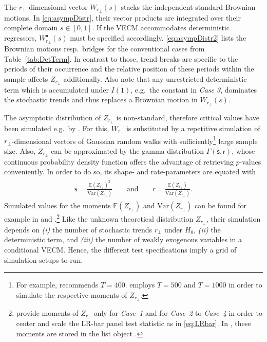 The $ r_\perp $-dimensional vector $ W_{r_\perp} {\left( s \right)} $ stacks the independent standard Brownian motions. In \eqref{eq:asympDistr}, their vector products are integrated over their complete domain $ s \in [0,1] $. If the VECM accommodates deterministic regressors, $ W^\bullet_{r_\perp} {\left( s \right)} $ must be specified accordingly. \eqref{eq:asympDistr2} lists the Brownian motions resp.~bridges for the conventional cases from Table~\ref{tab:DetTerm}. In contrast to those, trend breaks are specific to the periods of their occurrence and the relative position of these periods within the sample affects $ Z_{r_\perp} $ additionally. Also note that any unrestricted deterministic term which is accumulated under $ I(1) $, e.g.~the constant in \textit{Case 3}, dominates the stochastic trends and thus replaces a Brownian motion in $ W_{r_\perp} {\left( s \right)} $.

The asymptotic distribution of $ Z_{r_\perp} $ is non-standard, therefore critical values have been simulated e.g.~by \cite{OsterwaldLenum1992}. For this, $ W_{r_\perp} $ is substituted by a repetitive simulation of $ r_\perp $-dimensional vectors of Gaussian random walks with sufficiently\footnote{For example, \citet[Ch.~15]{Johansen1996} recommends $T=400$. \citet[p.~171, App.~B]{Breitung2005} employs $ T=500$ and \citet{OersalDroge2014} $ T=1000 $ in order to simulate the respective moments of $ Z_{r_\perp} $.} large sample size. Also, $ Z_{r_\perp} $ can be approximated by the gamma distribution $ \Gamma (\mathsf{s}, \mathsf{r}) $, whose continuous probability density function offers the advantage of retrieving $p$-values conveniently. In order to do so, its shape- and rate-parameters are equated with
\begin{align} \label{eq:GammaParameter}
\begin{split}
	\mathsf{s} = \frac{\mathbb{E}(Z_{r_\perp})^2}{ \text{Var}(Z_{r_\perp}) } \qquad \text{and} \qquad \mathsf{r} = \frac{\mathbb{E}(Z_{r_\perp})}{ \text{Var}(Z_{r_\perp}) }.
\end{split}
\end{align}
Simulated values for the moments $ \mathbb{E}(Z_{r_\perp}) $ and $ \text{Var}(Z_{r_\perp}) $ can be found for example in \citet{LarssonEtAl2001} and \citet{Breitung2005}.\footnote{\citet{LarssonEtAl2001} provide moments of $ Z_{r_\perp} $ only for \textit{Case~1} and \citet{Breitung2005} for \textit{Case~2} to \textit{Case~4} in order to center and scale the LR-bar panel test statistic as in \eqref{eq:LRbar}. In , these moments are stored in the list object .} Like the unknown theoretical distribution $ Z_{r_\perp} $, their simulation depends on \textit{(i)} the number of stochastic trends $ r_\perp $ under $ H_0 $, \textit{(ii)} the deterministic term, and \textit{(iii)} the number of weakly exogenous variables in a conditional VECM. Hence, the different test specifications imply a grid of simulation setups to run.

